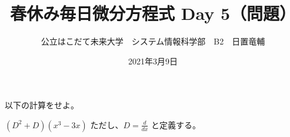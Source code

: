 \documentclass[dvipdfmx,uplatex]{jsarticle}
\title{春休み毎日微分方程式 Day 5（問題）}
\author{公立はこだて未来大学　システム情報科学部　B2　日置竜輔}
\date{2021年3月9日}
\begin{document}
\begin{spacing}{1.6}
\maketitle

以下の計算をせよ。
\begin{qparts}
    \qpart $ \displaystyle (D ^ 2 + D)(x ^ 3 - 3x) $ \quad ただし、$ \displaystyle D = \frac{d}{dx} $ と定義する。\\
\end{qparts}
\end{spacing}
\end{document}
